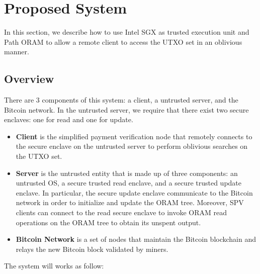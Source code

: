 
\section{Proposed System} %
\label{sec:new-protocol}
In this section, we describe how to use Intel SGX as trusted execution unit and Path ORAM to allow a remote client to access the UTXO set in an oblivious manner.

\subsection{Overview} %
\label{sub:overview}
There are 3 components of this system: a client, a untrusted server, and the Bitcoin network. In the untrusted server, we require that there exist two secure enclaves: one for read and one for update.
\begin{itemize}
	\item \textbf{Client} is the simplified payment verification node that remotely connects to the secure enclave on the untrusted server to perform oblivious searches on the UTXO set.

	\item \textbf{Server} is the untrusted entity that is made up of three components: an untrusted OS, a secure trusted read enclave, and a secure trusted update enclave. In particular, the secure update enclave communicate to the Bitcoin network in order to initialize and update the ORAM tree. Moreover, SPV clients can connect to the read secure enclave to invoke ORAM read operations on the ORAM tree to obtain its unspent output.

	\item \textbf{Bitcoin Network} is a set of nodes that maintain the Bitcoin blockchain and relays the new Bitcoin block validated by miners.
\end{itemize}
The system will works as follow:
